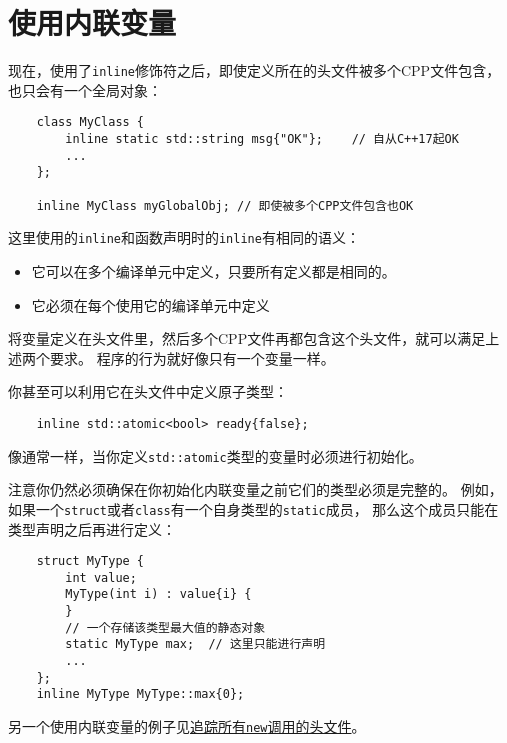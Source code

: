 \section{使用内联变量}
现在，使用了\texttt{inline}修饰符之后，即使定义所在的头文件被多个CPP文件包含，
也只会有一个全局对象：
\begin{lstlisting}
    class MyClass {
        inline static std::string msg{"OK"};    // 自从C++17起OK
        ...
    };

    inline MyClass myGlobalObj; // 即使被多个CPP文件包含也OK
\end{lstlisting}
这里使用的\texttt{inline}和函数声明时的\texttt{inline}有相同的语义：
\begin{itemize}
    \item 它可以在多个编译单元中定义，只要所有定义都是相同的。
    \item 它必须在每个使用它的编译单元中定义
\end{itemize}
将变量定义在头文件里，然后多个CPP文件再都包含这个头文件，就可以满足上述两个要求。
程序的行为就好像只有一个变量一样。

你甚至可以利用它在头文件中定义原子类型：
\begin{lstlisting}
    inline std::atomic<bool> ready{false};
\end{lstlisting}
像通常一样，当你定义\texttt{std::atomic}类型的变量时必须进行初始化。

注意你仍然必须确保在你初始化内联变量之前它们的类型必须是完整的。
例如，如果一个\texttt{struct}或者\texttt{class}有一个自身类型的\texttt{static}成员，
那么这个成员只能在类型声明之后再进行定义：
\begin{lstlisting}
    struct MyType {
        int value;
        MyType(int i) : value{i} {
        }
        // 一个存储该类型最大值的静态对象
        static MyType max;  // 这里只能进行声明
        ...
    };
    inline MyType MyType::max{0};
\end{lstlisting}
另一个使用内联变量的例子见\hyperref[ch30.4]{追踪所有\texttt{new}调用的头文件}。

